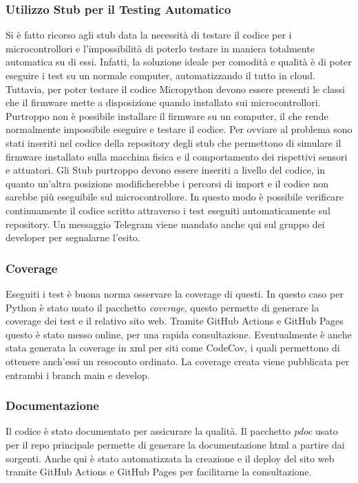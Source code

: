         \subsubsection{Utilizzo Stub per il Testing Automatico}
        Si è fatto ricorso agli stub data la necessità di testare il codice per i microcontrollori e l'impossibilità di poterlo testare in maniera totalmente automatica su di essi. Infatti, la soluzione ideale per comodità e qualità è di poter eseguire i test su un normale computer, automatizzando il tutto in cloud. Tuttavia, per poter testare il codice Micropython devono essere presenti le classi che il firmware mette a disposizione quando installato sui microcontrollori. Purtroppo non è possibile installare il firmware su un computer, il che rende normalmente impossibile eseguire e testare il codice. 
        Per ovviare al problema sono stati inseriti nel codice della repository degli stub che permettono di simulare il firmware installato sulla macchina fisica e il comportamento dei rispettivi sensori e attuatori. Gli Stub purtroppo devono essere inseriti a livello del codice, in quanto un'altra posizione modificherebbe i percorsi di import e il codice non sarebbe più eseguibile sul microcontrollore. In questo modo è possibile verificare continuamente il codice scritto attraverso i test eseguiti automaticamente sul repository. Un messaggio Telegram viene mandato anche qui sul gruppo dei developer per segnalarne l'esito.
        
        \subsubsection{Coverage} Eseguiti i test è buona norma osservare la coverage di questi. In questo caso per Python è stato usato il pacchetto \textit{coverage}, questo permette di generare la coverage dei test e il relativo sito web. Tramite GitHub Actions e GitHub Pages questo è stato messo online, per una rapida consultazione. Eventualmente è anche stata generata la coverage in xml per siti come CodeCov, i quali permettono di ottenere anch'essi un resoconto ordinato. La coverage creata viene pubblicata per entrambi i branch main e develop.
        
        \subsubsection{Documentazione} Il codice è stato documentato per assicurare la qualità. Il pacchetto \textit{pdoc} usato per il repo principale permette di generare la documentazione html a partire dai sorgenti. Anche qui è stato automatizzata la creazione e il deploy del sito web tramite GitHub Actions e GitHub Pages per facilitarne la consultazione. 
        
